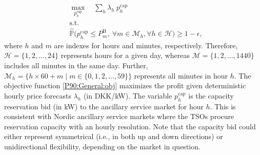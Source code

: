 \documentclass[conference]{IEEEtran}
\begin{document}
\begin{subequations}\label{P90:General}
    \begin{align}
    & \max_{p_{h}^{\text{cap}}} \quad  \sum_h \lambda_h \ p_{h}^{\text{cap}} \label{P90:General:obj}                                                                                                                                               \\
    &\text{s.t.} \nonumber  \\
    & \hat{\mathbb{P}}  \Big( p_{h}^{\text{cap}} \leq P_{m}^{\text{B}}, \ \forall{m} \in \mathcal{M}_{h},  \forall{h} \in \mathcal{H}  \Big) \geq 1 - \epsilon, \label{P90:General:jcc}
\end{align}    
\end{subequations}
where $h$ and $m$ are indexes for hours and minutes, respectively. Therefore, $\mathcal{H}\!=\!\{1, 2,  \ldots, 24\}$ represents hours for a given day, whereas $\mathcal{M}\!=\!\{1, 2,  \ldots, 1440\}$ includes all minutes in the same day. Further, $ \mathcal{M}_{h}\!=\!\{h \times 60 + m \mid m \in \{0, 1, 2, \ldots, 59\}\}$ represents all minutes in hour $h$. The objective function 
\eqref{P90:General:obj} maximizes the profit given deterministic hourly price forecasts $\lambda_h$ (in DKK/kW). The variable $p_{h}^{\text{cap}}$ is the capacity reservation bid (in kW) to the ancillary service market for hour $h$. This is consistent with Nordic ancillary service markets where the TSOs procure reservation capacity with an hourly resolution. Note that the capacity bid could either represent symmetrical (i.e., in both up and down directions) or unidirectional flexibility, depending on the market in question. %
\end{document}
